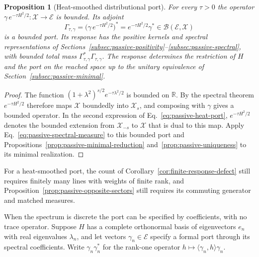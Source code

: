 \documentclass[11pt]{article}
\newtheorem{proposition}{Proposition}[section]
\theoremstyle{definition}
\newcommand{\R}{\mathbb R}
\begin{document}
\begin{proposition}[Heat-smoothed distributional port]
\label{prop:passive-heat-distributional}
For every $\tau>0$ the operator $\gamma\,e^{-\tau H^2/2}:\mathcal X\to\mathcal E$ is bounded. Its adjoint
\begin{equation}
 \Gamma_{\tau,\gamma}=\bigl(\gamma\,e^{-\tau H^2/2}\bigr)^*=e^{-\tau H^2/2}\gamma^*\in\mathcal B(\mathcal E,\mathcal X)
 \label{eq:passive-heat-port}
\end{equation}
is a bounded port. Its response has the positive kernels and spectral representations of Sections~\ref{subsec:passive-positivity}--\ref{subsec:passive-spectral}, with bounded total mass $\Gamma_{\tau,\gamma}^*\Gamma_{\tau,\gamma}$. The response determines the restriction of $H$ and the port on the reached space up to the unitary equivalence of Section~\ref{subsec:passive-minimal}.
\end{proposition}
\begin{proof}
The function $(1+\lambda^2)^{s/2}e^{-\tau\lambda^2/2}$ is bounded on $\R$. By the spectral theorem $e^{-\tau H^2/2}$ therefore maps $\mathcal X$ boundedly into $\mathcal X_s$, and composing with $\gamma$ gives a bounded operator. In the second expression of Eq.~\eqref{eq:passive-heat-port}, $e^{-\tau H^2/2}$ denotes the bounded extension from $\mathcal X_{-s}$ to $\mathcal X$ that is dual to this map. Apply Eq.~\eqref{eq:passive-spectral-measure} to this bounded port and Propositions~\ref{prop:passive-minimal-reduction} and~\ref{prop:passive-uniqueness} to its minimal realization.
\end{proof}

For a heat-smoothed port, the count of Corollary~\ref{cor:finite-response-defect} still requires finitely many lines with weights of finite rank, and Proposition~\ref{prop:passive-opposite-sectors} still requires its commuting generator and matched measures.

When the spectrum is discrete the port can be specified by coefficients, with no trace operator. Suppose $H$ has a complete orthonormal basis of eigenvectors $e_n$ with real eigenvalues $\lambda_n$, and let vectors $\gamma_n\in\mathcal E$ specify a formal port through its spectral coefficients. Write $\gamma_n\gamma_n^*$ for the rank-one operator $h\mapsto\langle\gamma_n,h\rangle\gamma_n$.
\end{document}
